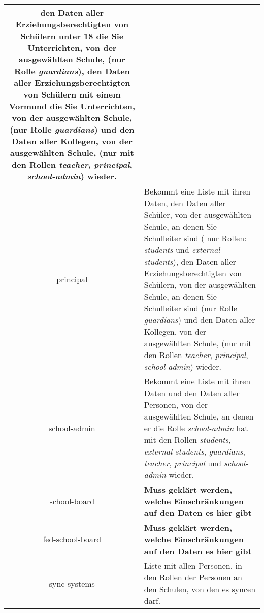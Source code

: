 \begin{longtable}{|c|p{}|}
					den Daten aller Erziehungsberechtigten von Schülern unter 18 die Sie Unterrichten, von der ausgewählten Schule, (nur Rolle \textit{guardians}),
					den Daten aller Erziehungsberechtigten von Schülern mit einem Vormund die Sie Unterrichten, von der ausgewählten Schule, (nur Rolle \textit{guardians}) und
					den Daten aller Kollegen, von der ausgewählten Schule, (nur mit den Rollen \textit{teacher}, \textit{principal}, \textit{school-admin}) 
					wieder.\\ \hline
principal & Bekommt eine Liste mit ihren Daten,
            den Daten aller Schüler, von der ausgewählten Schule, an denen Sie Schulleiter sind ( nur Rollen: \textit{students} und \textit{external-students}),
						den Daten aller Erziehungsberechtigten von Schülern, von der ausgewählten Schule, an denen Sie Schulleiter sind (nur Rolle \textit{guardians}) und
					  den Daten aller Kollegen, von der ausgewählten Schule, (nur mit den Rollen \textit{teacher}, \textit{principal}, \textit{school-admin})
						wieder.\\ \hline
school-admin & Bekommt eine Liste mit ihren Daten und
               den Daten aller Personen, von der ausgewählten Schule, an denen er die Rolle \textit{school-admin} hat mit den Rollen \textit{students}, \textit{external-students}, \textit{guardians}, \textit{teacher}, \textit{principal} und \textit{school-admin} wieder.  \\ \hline
school-board & \textcolor[rgb]{1,0.41,0.13}{\textbf{Muss geklärt werden, welche Einschränkungen auf den Daten es hier gibt}} \\ \hline
fed-school-board & \textcolor[rgb]{1,0.41,0.13}{\textbf{Muss geklärt werden, welche Einschränkungen auf den Daten es hier gibt}} \\ \hline
sync-systems & Liste mit allen Personen, in den Rollen der Personen an den Schulen, von den es syncen darf. \\ \hline
	\end{longtable}